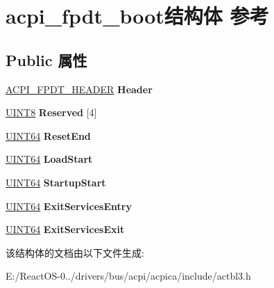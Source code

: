 \hypertarget{structacpi__fpdt__boot}{}\section{acpi\+\_\+fpdt\+\_\+boot结构体 参考}
\label{structacpi__fpdt__boot}
\subsection*{Public 属性}
\begin{DoxyCompactItemize}
\item 
\mbox{\label{structacpi__fpdt__boot_acc7000caec586949e5074e91a018f391}} 
\hyperlink{structacpi__fpdt__header}{A\+C\+P\+I\+\_\+\+F\+P\+D\+T\+\_\+\+H\+E\+A\+D\+ER} {\bfseries Header}
\item 
\mbox{\label{structacpi__fpdt__boot_a6cb33b4ee46b120701eb4dd688ce8510}} 
\hyperlink{_processor_bind_8h_ab27e9918b538ce9d8ca692479b375b6a}{U\+I\+N\+T8} {\bfseries Reserved} \mbox{[}4\mbox{]}
\item 
\mbox{\label{structacpi__fpdt__boot_a2dc7519bca896a7dbffdd6a6e8d3a439}} 
\hyperlink{_processor_bind_8h_a57be03562867144161c1bfee95ca8f7c}{U\+I\+N\+T64} {\bfseries Reset\+End}
\item 
\mbox{\label{structacpi__fpdt__boot_abe40dfbd115bcbe4addce6f0197be2f7}} 
\hyperlink{_processor_bind_8h_a57be03562867144161c1bfee95ca8f7c}{U\+I\+N\+T64} {\bfseries Load\+Start}
\item 
\mbox{\label{structacpi__fpdt__boot_a4556c8b407733c9b854437ac92b8bcc3}} 
\hyperlink{_processor_bind_8h_a57be03562867144161c1bfee95ca8f7c}{U\+I\+N\+T64} {\bfseries Startup\+Start}
\item 
\mbox{\label{structacpi__fpdt__boot_a1d63c8eb235cf62e39ee99cd750e23a5}} 
\hyperlink{_processor_bind_8h_a57be03562867144161c1bfee95ca8f7c}{U\+I\+N\+T64} {\bfseries Exit\+Services\+Entry}
\item 
\mbox{\label{structacpi__fpdt__boot_aa9143729e3154067021c40055c572aa1}} 
\hyperlink{_processor_bind_8h_a57be03562867144161c1bfee95ca8f7c}{U\+I\+N\+T64} {\bfseries Exit\+Services\+Exit}
\end{DoxyCompactItemize}


该结构体的文档由以下文件生成\+:\begin{DoxyCompactItemize}
\item 
E\+:/\+React\+O\+S-\/0../drivers/bus/acpi/acpica/include/actbl3.\+h\end{DoxyCompactItemize}
